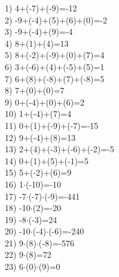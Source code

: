 \documentclass[a4paper,10pt]{article}
\begin{document}
1)   4+(-7)+(-9)=-12
\vspace{0.5cm}\\2)   -9+(-4)+(5)+(6)+(0)=-2
\vspace{0.5cm}\\3)   -9+(-4)+(9)=-4
\vspace{0.5cm}\\4)   8+(1)+(4)=13
\vspace{0.5cm}\\5)   8+(-2)+(-9)+(0)+(7)=4
\vspace{0.5cm}\\6)   3+(-6)+(4)+(-5)+(5)=1
\vspace{0.5cm}\\7)   6+(8)+(-8)+(7)+(-8)=5
\vspace{0.5cm}\\8)   7+(0)+(0)=7
\vspace{0.5cm}\\9)   0+(-4)+(0)+(6)=2
\vspace{0.5cm}\\10)   1+(-4)+(7)=4
\vspace{0.5cm}\\11)   0+(1)+(-9)+(-7)=-15
\vspace{0.5cm}\\12)   9+(-4)+(8)=13
\vspace{0.5cm}\\13)   2+(4)+(-3)+(-6)+(-2)=-5
\vspace{0.5cm}\\14)   0+(1)+(5)+(-1)=5
\vspace{0.5cm}\\15)   5+(-2)+(6)=9
\vspace{0.5cm}\\16)   1$\cdot$(-10)=-10
\vspace{0.5cm}\\17)   -7$\cdot$(-7)$\cdot$(-9)=-441
\vspace{0.5cm}\\18)   -10$\cdot$(2)=-20
\vspace{0.5cm}\\19)   -8$\cdot$(-3)=24
\vspace{0.5cm}\\20)   -10$\cdot$(-4)$\cdot$(-6)=-240
\vspace{0.5cm}\\21)   9$\cdot$(8)$\cdot$(-8)=-576
\vspace{0.5cm}\\22)   9$\cdot$(8)=72
\vspace{0.5cm}\\23)   6$\cdot$(0)$\cdot$(9)=0
\end{document}
